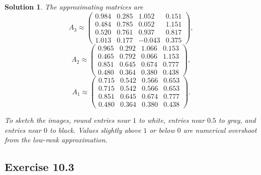 \documentclass[11pt,a4paper]{article}
\theoremstyle{sol}
\newtheorem*{solution}{Solution}
\begin{document}
\begin{solution}
The approximating matrices are
\[
A_3\approx
\begin{pmatrix}
0.984&0.285&1.052&0.151\\
0.484&0.785&0.052&1.151\\
0.520&0.761&0.937&0.817\\
1.013&0.177&-0.043&0.375
\end{pmatrix},
\]
\[
A_2\approx
\begin{pmatrix}
0.965&0.292&1.066&0.153\\
0.465&0.792&0.066&1.153\\
0.851&0.645&0.674&0.777\\
0.480&0.364&0.380&0.438
\end{pmatrix},
\]
\[
A_1\approx
\begin{pmatrix}
0.715&0.542&0.566&0.653\\
0.715&0.542&0.566&0.653\\
0.851&0.645&0.674&0.777\\
0.480&0.364&0.380&0.438
\end{pmatrix}.
\]

To sketch the images, round entries near $1$ to white, entries near $0.5$ to gray, and entries near $0$ to black. Values slightly above $1$ or below $0$ are numerical overshoot from the low-rank approximation.
\end{solution}

\clearpage
\subsection*{Exercise 10.3}
\end{document}
